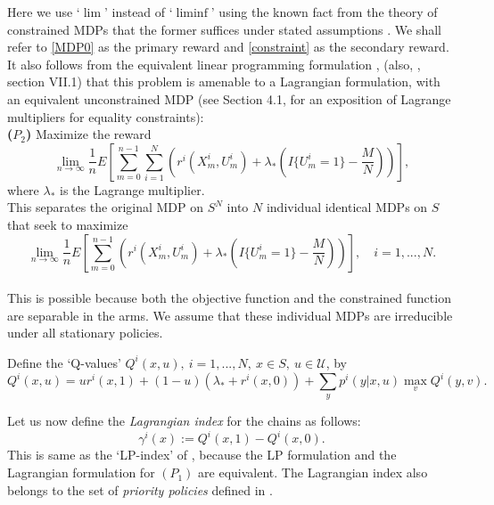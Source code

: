 \documentclass[12pt]{article}
\numberwithin{equation}{section}
\newcommand{\1}{\textbf{1}}
\newcommand{\U}{\mathcal{U}}
\begin{document}
Here we use `$\lim$' instead of `$\liminf$' using the known fact from the theory of constrained MDPs that the former suffices under stated assumptions \cite{Altman,Ross,Piunov}. We shall refer to \eqref{MDP0} as the primary reward and \eqref{constraint} as the secondary reward. It also follows from the equivalent linear programming formulation \cite{BorkarConstrained}, (also, \cite{BorkarTopics}, section VII.1) that this problem is amenable to a Lagrangian formulation, with an equivalent unconstrained MDP (see Section 4.1, \cite{Bertsekas} for an exposition of Lagrange multipliers for equality constraints):\\

\noindent \textbf{($P_2$)}  Maximize the reward 
$$
\lim_{n\to\infty}\frac{1}{n}E\left[\sum_{m=0}^{n-1}\sum_{i=1}^N\left(r^i(X^i_m,U^i_m) + \lambda_*\left(I\{U^i_m=1\}- \frac{M}{N}\right)\right)\right], 
$$
where $\lambda_*$ is the Lagrange multiplier. \\

This separates the original MDP on $S^N$ into $N$ individual identical MDPs on $S$ that seek to maximize
\begin{equation}
\lim_{n\to\infty}\frac{1}{n}E\left[\sum_{m=0}^{n-1}\left(r^i(X^i_m,U^i_m) + \lambda_*\left(I\{U^i_m=1\}- \frac{M}{N}\right)\right)\right],
\quad i=1,...,N. \label{MDP}
\end{equation}
\\
This is possible because both the objective function and the constrained function are separable in the arms. 
We assume that these individual MDPs are irreducible under all stationary policies. 



Define the `Q-values' $Q^i(x,u), \ i=1,...,N, \ x \in S, \ u \in \U$, by
$$
Q^i(x,u) = u r^i(x,1) + (1-u) (\lambda_* + r^i(x,0)) + \sum_y p^i(y|x,u) \max_v Q^i(y,v).
$$

Let us now define the {\it Lagrangian index} for the chains as follows:
\begin{equation}
\gamma^i(x) := Q^i(x,1) - Q^i(x,0). \label{Lindex}
\end{equation}
This is same as the `LP-index' of \cite{Gast}, because the LP formulation and the Lagrangian formulation for $(P_1)$ are equivalent.
The Lagrangian index also belongs to the set of {\it priority policies} defined in \cite{Verloop}.
 \\
\end{document}
